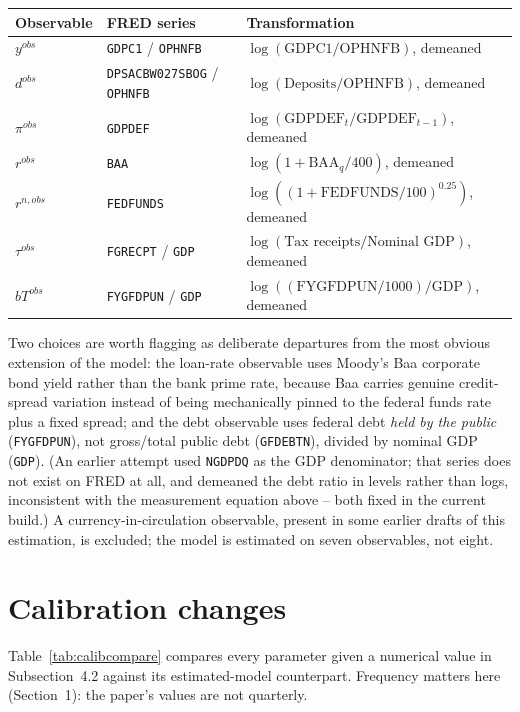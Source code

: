 \documentclass[11pt]{article}
\begin{document}
\begin{center}
\begin{tabular}{@{}lll@{}}
\toprule
Observable & FRED series & Transformation \\
\midrule
$y^{obs}$ & \texttt{GDPC1} / \texttt{OPHNFB} & $\log(\text{GDPC1}/\text{OPHNFB})$, demeaned \\
$d^{obs}$ & \texttt{DPSACBW027SBOG} / \texttt{OPHNFB} & $\log(\text{Deposits}/\text{OPHNFB})$, demeaned \\
$\pi^{obs}$ & \texttt{GDPDEF} & $\log(\text{GDPDEF}_t/\text{GDPDEF}_{t-1})$, demeaned \\
$r^{obs}$ & \texttt{BAA} & $\log(1+\text{BAA}_q/400)$, demeaned \\
$r^{n,obs}$ & \texttt{FEDFUNDS} & $\log((1+\text{FEDFUNDS}/100)^{0.25})$, demeaned \\
$\tau^{obs}$ & \texttt{FGRECPT} / \texttt{GDP} & $\log(\text{Tax receipts}/\text{Nominal GDP})$, demeaned \\
$bT^{obs}$ & \texttt{FYGFDPUN} / \texttt{GDP} & $\log((\text{FYGFDPUN}/1000)/\text{GDP})$, demeaned \\
\bottomrule
\end{tabular}
\end{center}

Two choices are worth flagging as deliberate departures from the most
obvious extension of the model: the loan-rate observable uses Moody's
Baa corporate bond yield rather than the bank prime rate, because Baa
carries genuine credit-spread variation instead of being mechanically
pinned to the federal funds rate plus a fixed spread; and the debt
observable uses federal debt \emph{held by the public}
(\texttt{FYGFDPUN}), not gross/total public debt (\texttt{GFDEBTN}),
divided by nominal GDP (\texttt{GDP}). (An earlier attempt used
\texttt{NGDPDQ} as the GDP denominator; that series does not exist on
FRED at all, and demeaned the debt ratio in levels rather than logs,
inconsistent with the measurement equation above -- both fixed in the
current build.) A currency-in-circulation observable, present in some
earlier drafts of this estimation, is excluded; the model is estimated
on seven observables, not eight.

\section{Calibration changes}

Table~\ref{tab:calibcompare} compares every parameter given a numerical
value in Subsection~4.2 against its estimated-model counterpart.
Frequency matters here (Section~1): the paper's values are not
quarterly.
\end{document}
